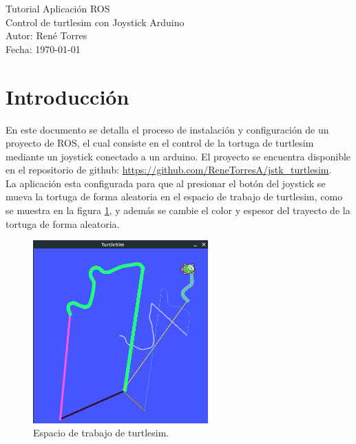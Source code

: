 \documentclass{article}
\begin{document}

\vspace*{5cm}
\begin{center}
  \LARGE{Tutorial Aplicación ROS}\\
  \large{Control de turtlesim con Joystick Arduino}\\
  \vspace*{1cm}
  \large{Autor: René Torres}\\
  \large{Fecha: \today}
\end{center}


\thispagestyle{sinfooter} %

\newpage

\tableofcontents

\newpage


\section{Introducción}

En este documento se detalla el proceso de instalación y configuración de un proyecto de ROS, el cual consiste en el control de la tortuga de turtlesim mediante un joystick conectado a un arduino. El proyecto se encuentra disponible en el repositorio de github: \url{https://github.com/ReneTorresA/jstk_turtlesim}.\\

La aplicación esta configurada para que al presionar el botón del joystick se mueva la tortuga de forma aleatoria en el espacio de trabajo de turtlesim, como se muestra en la figura \ref{fig:turtlesim}, y además se cambie el color y espesor del trayecto de la tortuga de forma aleatoria.

\begin{figure}[H]
  \centering
  \includegraphics[width=0.6\textwidth ]{images/turtlesim.png}
  \caption{Espacio de trabajo de turtlesim.}
  \label{fig:turtlesim}
\end{figure}
\end{document}
